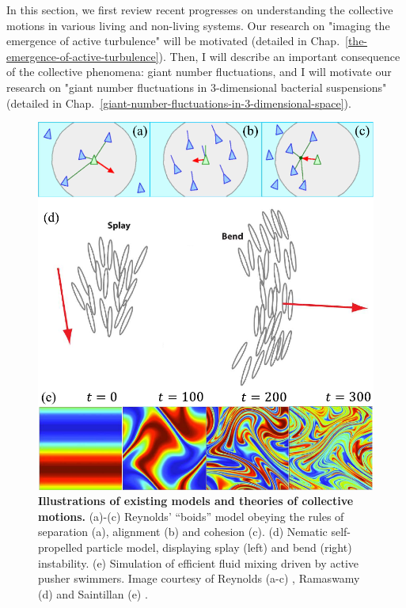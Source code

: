 In this section, we first review recent progresses on understanding the collective motions in various living and non-living systems. Our research on "imaging the emergence of active turbulence" will be motivated
(detailed in Chap.~\ref{the-emergence-of-active-turbulence}). Then, I will describe an important consequence of the collective phenomena: giant number fluctuations, and I will motivate our research on "giant number fluctuations in 3-dimensional bacterial suspensions" (detailed in Chap.~\ref{giant-number-fluctuations-in-3-dimensional-space}).

\begin{figure}[!htbp]
	\begin{center}
	\includegraphics[width=5.5 in]{Figs/1-Intro/4.pdf}
	\end{center}
	\caption[Figure 1.4:]
	{
	\textbf{Illustrations of existing models and theories of collective motions.}
	(a)-(c) Reynolds’ “boids” model obeying the rules of separation (a), alignment (b) and cohesion (c).
	(d) Nematic self-propelled particle model, displaying splay (left) and bend (right) instability.
	(e) Simulation of efficient fluid mixing driven by active pusher swimmers.
	Image courtesy of Reynolds (a-c) \cite{Reynolds1987}, Ramaswamy (d) \cite{Ramaswamy2010} and Saintillan (e) \cite{Saintillan2008b}.
	}
	\label{fig:models-of-collective-motions}
\end{figure}

